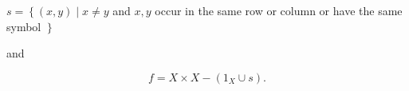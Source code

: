 \documentclass{beamer}
\begin{document}
\begin{frame}


    $ s = \left\{  (x,y) \mid x \neq y \right.$ and $x, y$ occur in the same row or column or have the same symbol $\left.\right\}$

    and

        \[
            f=X\times X-(1_X\cup s).
        \] 
\end{frame}
\end{document}
